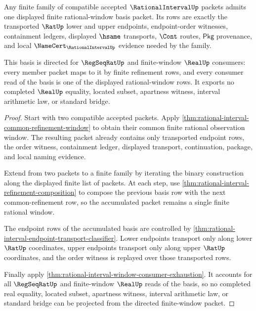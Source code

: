 \begin{theorem}
\label{thm:rational-interval-directed-refinement-basis}
Any finite family of compatible accepted $\RationalIntervalUp$ packets admits
one displayed finite rational-window basis packet. Its rows are exactly the
transported $\RatUp$ lower and upper endpoints, endpoint-order witnesses,
containment ledgers, displayed $\hsame$ transports, $\Cont$ routes,
$\mathsf{Pkg}$ provenance, and local $\NameCert_{\RationalIntervalUp}$
evidence needed by the family.

This basis is directed for $\RegSeqRatUp$ and finite-window $\RealUp$
consumers: every member packet maps to it by finite refinement rows, and every
consumer read of the basis is one of the displayed rational-window rows. It
exports no completed $\RealUp$ equality, located subset, apartness witness,
interval arithmetic law, or standard bridge.
\end{theorem}
\begin{proof}
Start with two compatible accepted packets. Apply
\autoref{thm:rational-interval-common-refinement-window} to obtain their common
finite rational observation window. The resulting packet already contains only
transported endpoint rows, the order witness, containment ledger, displayed
transport, continuation, package, and local naming evidence.

Extend from two packets to a finite family by iterating the binary construction
along the displayed finite list of packets. At each step, use
\autoref{thm:rational-interval-refinement-composition} to compose the previous
basis row with the next common-refinement row, so the accumulated packet remains
a single finite rational window.

The endpoint rows of the accumulated basis are controlled by
\autoref{thm:rational-interval-endpoint-transport-classifier}. Lower endpoints
transport only along lower $\RatUp$ coordinates, upper endpoints transport only
along upper $\RatUp$ coordinates, and the order witness is replayed over those
transported rows.

Finally apply
\autoref{thm:rational-interval-window-consumer-exhaustion}. It accounts for all
$\RegSeqRatUp$ and finite-window $\RealUp$ reads of the basis, so no completed
real equality, located subset, apartness witness, interval arithmetic law, or
standard bridge can be projected from the directed finite-window packet.
\end{proof}

